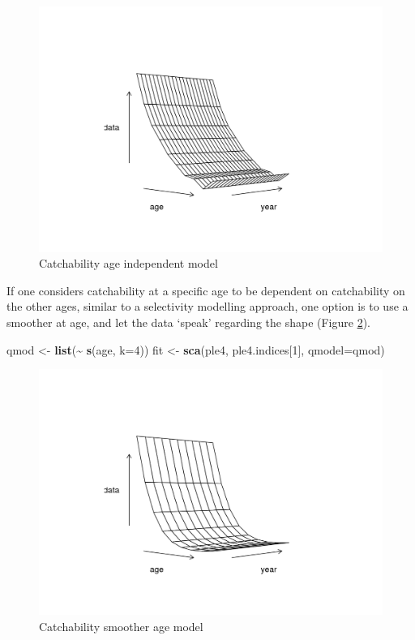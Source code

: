 \documentclass[
]{book}
\newenvironment{Shaded}{\begin{snugshade}}{\end{snugshade}}
\newcommand{\AttributeTok}[1]{\textcolor[rgb]{0.13,0.29,0.53}{#1}}
\newcommand{\DecValTok}[1]{\textcolor[rgb]{0.00,0.00,0.81}{#1}}
\newcommand{\FunctionTok}[1]{\textcolor[rgb]{0.13,0.29,0.53}{\textbf{#1}}}
\newcommand{\NormalTok}[1]{#1}
\newcommand{\OtherTok}[1]{\textcolor[rgb]{0.56,0.35,0.01}{#1}}
\newcommand{\SpecialCharTok}[1]{\textcolor[rgb]{0.81,0.36,0.00}{\textbf{#1}}}
\begin{document}
\begin{figure}
\centering
\includegraphics{_bookdown_files/_main_files/figure-html/dummyage-1.png}
\caption{\label{fig:dummyage}Catchability age independent model}
\end{figure}

If one considers catchability at a specific age to be dependent on catchability on the other ages, similar to a selectivity modelling approach, one option is to use a smoother at age, and let the data `speak' regarding the shape (Figure \ref{fig:smoothage}).

\begin{Shaded}
\begin{Highlighting}[]
\NormalTok{qmod }\OtherTok{\textless{}{-}} \FunctionTok{list}\NormalTok{(}\SpecialCharTok{\textasciitilde{}} \FunctionTok{s}\NormalTok{(age, }\AttributeTok{k=}\DecValTok{4}\NormalTok{))}
\NormalTok{fit }\OtherTok{\textless{}{-}} \FunctionTok{sca}\NormalTok{(ple4, ple4.indices[}\DecValTok{1}\NormalTok{], }\AttributeTok{qmodel=}\NormalTok{qmod)}
\end{Highlighting}
\end{Shaded}

\begin{figure}
\centering
\includegraphics{_bookdown_files/_main_files/figure-html/smoothage-1.png}
\caption{\label{fig:smoothage}Catchability smoother age model}
\end{figure}
\end{document}
